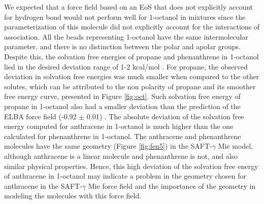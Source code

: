 \documentclass[final,12p,times,twocolumn]{elsarticle}
\begin{document}
	We expected that a force field based on an EoS that does not explicitly account for hydrogen bond would not perform well for 1-octanol in mixtures since the parameterization of this molecule did not explicitly account for the interactions of association. All the beads representing 1-octanol have the same intermolecular parameter, and there is no distinction between the polar and apolar groups. Despite this, the solvation free energies of propane and phenanthrene in 1-octanol lied in the desired deviation range of 1-2 kcal/mol \cite{doimobley}. For propane, the observed deviation in solvation free energies was much smaller when compared to the other solutes, which can be attributed to the non polarity of propane and its smoother free energy curve, presented in Figure \ref{fig:oct}. Such solvation free energy of propane in 1-octanol also had a smaller deviation than the prediction of the ELBA force field (-0.92 $\pm$ 0.01) \cite{doi:10.1021/acs.jctc.5b00963}. The absolute deviation of the solvation free energy computed for anthracene in 1-octanol is much higher than the one calculated for phenanthrene in 1-octanol. The anthracene and phenanthrene molecules have the same geometry (Figure \ref{fig:fen5}) in the SAFT-$\gamma$ Mie model, although anthracene is a linear molecule and phenanthrene is not, and also similar physical properties. Hence, this high deviation of the solvation free energy of anthracene in 1-octanol may indicate a problem in the geometry chosen for anthracene in the SAFT-$\gamma$ Mie force field and the importance of the geometry in modeling the molecules with this force field.   
	
\end{document}
